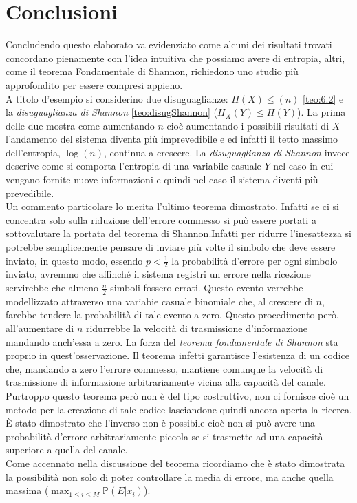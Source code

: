 \chapter{Conclusioni}
\label{cha:conclusioni}
Concludendo questo elaborato va evidenziato come alcuni dei risultati trovati concordano pienamente con l'idea intuitiva che possiamo avere di entropia, altri, come il teorema Fondamentale di Shannon, richiedono uno studio più approfondito per essere compresi appieno.\\
A titolo d'esempio si considerino due disuguaglianze: $H(X)\leq(n)$ \ref{teo:6.2} e la \textit{disuguaglianza di Shannon} \ref{teo:disugShannon} ($H_X(Y)\leq H(Y)$). La prima delle due mostra come aumentando $n$ cioè aumentando i possibili risultati di $X$ l'andamento  del sistema diventa più imprevedibile e ed infatti il tetto massimo dell'entropia, $\log(n)$, continua a crescere. La \textit{disuguaglianza di Shannon} invece descrive come si comporta l'entropia di una variabile casuale $Y$ nel caso in cui vengano fornite nuove informazioni e quindi nel caso il sistema diventi più prevedibile.\\ 
Un commento particolare lo merita l'ultimo teorema dimostrato. Infatti se ci si concentra solo sulla riduzione dell'errore commesso si può essere portati a sottovalutare la portata del teorema di Shannon.Infatti per ridurre l'inesattezza si potrebbe semplicemente pensare di inviare più volte il simbolo che deve essere inviato, in questo modo, essendo $p<\frac{1}{2}$ la probabilità d'errore per ogni simbolo inviato, avremmo che affinché il sistema registri un errore nella ricezione servirebbe che almeno $\frac{n}{2}$ simboli fossero errati. Questo evento verrebbe modellizzato attraverso una variabie casuale binomiale che, al crescere di $n$, farebbe tendere la probabilità di tale evento a zero. Questo procedimento però, all'aumentare di $n$ ridurrebbe la velocità di trasmissione d'informazione mandando anch'essa a zero. La forza del \textit{teorema fondamentale di Shannon} sta proprio in quest'osservazione. Il teorema infetti garantisce l'esistenza di un codice che, mandando a zero l'errore commesso, mantiene comunque la velocità di trasmissione di informazione arbitrariamente vicina alla capacità del canale. Purtroppo questo teorema però non è del tipo costruttivo, non ci fornisce cioè un metodo per la creazione di tale codice lasciandone quindi ancora aperta la ricerca.\\
È stato dimostrato che l'inverso non è possibile cioè non si può avere una probabilità d'errore arbitrariamente piccola se si trasmette ad una capacità superiore a quella del canale.\\
Come accennato nella discussione del teorema ricordiamo che  è stato dimostrata la possibilità non solo di poter controllare la media di errore, ma anche quella massima ($\max_{1\leq i \leq M} \mathbb{P}(E|x_i)$).\\







